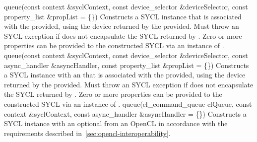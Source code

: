   \addRowThreeL
    { queue(const context \&syclContext, }
    { const device_selector \&deviceSelector, }
    { const property_list \&propList = \{\}) }
    {
      Constructs a SYCL  instance that is associated with the
       provided, using the device returned by the
       provided. Must throw an
       SYCL exception if
       does not encapsulate the SYCL
       returned by . Zero or more
      properties can be provided to the constructed SYCL 
      via an instance of .
    }
  \addRowFourL
    { queue(const context \&syclContext, }
    { const device_selector \&deviceSelector, }
    { const async_handler \&asyncHandler, }
    { const property_list \&propList = \{\}) }
    {
      Constructs a SYCL  instance with an  that is associated with the 
      provided, using the device returned by the 
      provided. Must throw an  SYCL exception
      if  does not encapsulate the SYCL
       returned by . Zero or more
      properties can be provided to the constructed SYCL  via
      an instance of .
    }
  \addRowThreeL
    { queue(cl_command_queue clQueue,}
    { const context \&syclContext, }
    { const async_handler \&asyncHandler = \{\}) }
    {
      Constructs a SYCL  instance with an optional
       from an OpenCL 
      in accordance with the requirements described
      in~\ref{sec:opencl-interoperability}.
    }
\completeInfoTable

